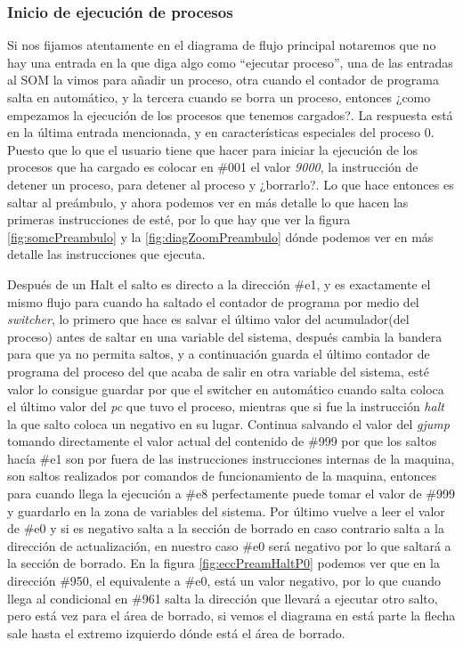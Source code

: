\documentclass[letterpaper,12pt,oneside]{book}
\begin{document}
		
		
		
		\subsubsection{Inicio de ejecución de procesos}
		
		Si nos fijamos atentamente en el diagrama de flujo principal notaremos que no hay una entrada en la que diga algo como ``ejecutar proceso'', una
		de las entradas al SOM la vimos para añadir un proceso, otra cuando el contador de programa salta en automático, y la tercera cuando se borra
		un proceso, entonces ¿como empezamos la ejecución de los procesos que tenemos cargados?. La respuesta está en la última entrada mencionada, y
		en características especiales del proceso 0. Puesto que lo que el usuario tiene que hacer para iniciar la ejecución de los procesos
		que ha cargado es colocar en \#001 el valor \textit{9000}, la instrucción de detener un proceso, para detener al proceso y ¿borrarlo?. Lo que hace entonces
		es saltar al preámbulo, y ahora podemos ver en más detalle lo que hacen las primeras instrucciones de esté, por lo que hay que ver la figura \ref{fig:somcPreambulo}
		y la \ref{fig:diagZoomPreambulo} dónde podemos ver en más detalle las instrucciones que ejecuta.
		
		Después de un Halt el salto es directo a la
		dirección \#e1, y es exactamente el mismo flujo para cuando ha saltado el contador de programa por medio del \textit{switcher}, lo primero
		que hace es salvar el último valor del acumulador(del proceso) antes de saltar  en una variable del sistema, después cambia la bandera para que ya no permita 
		saltos, y a continuación guarda el último contador de programa del proceso del que acaba de salir en otra variable del sistema, esté valor lo consigue guardar
		por que el switcher en automático cuando salta coloca el último valor del \textit{pc} que tuvo el proceso, mientras que si fue la instrucción
		\textit{halt} la que salto coloca un negativo en su lugar. Continua salvando el valor del \textit{gjump} tomando directamente el valor actual del
		contenido de \#999 por que los saltos hacía \#e1 son por fuera de las instrucciones instrucciones internas de la maquina, son saltos
		realizados por comandos de funcionamiento de la maquina, entonces para cuando llega la ejecución a \#e8 perfectamente puede tomar el
		valor de \#999 y guardarlo en la zona de variables del sistema. Por último vuelve a leer el valor de \#e0 y si es negativo salta a la sección de borrado
		en caso contrario salta a la dirección de actualización, en nuestro caso \#e0 será negativo por lo que saltará a la sección de borrado. En
		la figura \ref{fig:eccPreamHaltP0} podemos ver que en la dirección \#950, el equivalente a \#e0, está un valor negativo, por lo que cuando llega
		al condicional en \#961 salta la dirección que llevará a ejecutar otro salto, pero está vez para el área de borrado, si vemos el diagrama
		en está parte la flecha sale hasta el extremo izquierdo dónde está el área de borrado.
		
\end{document}
